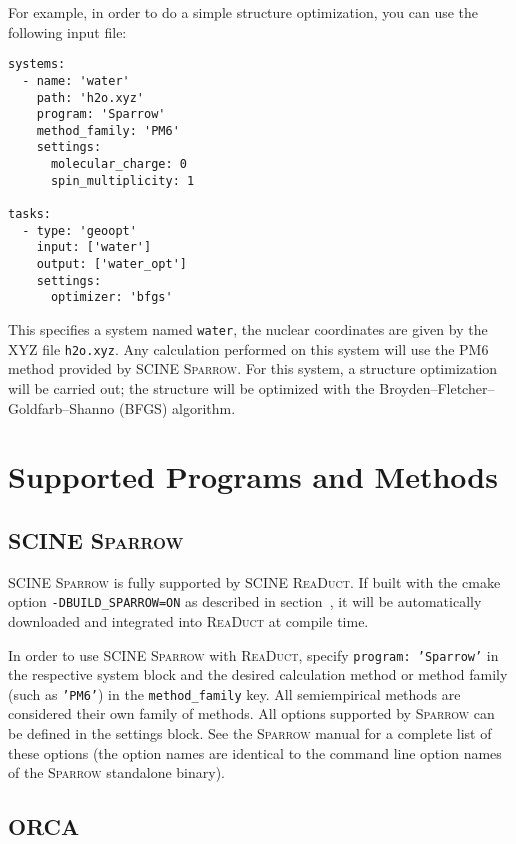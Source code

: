 \documentclass[]{tufte-book}
\begin{document}
For example, in order to do a simple structure optimization, you can use the following input file:

\begin{verbatim}
systems:
  - name: 'water'
    path: 'h2o.xyz'
    program: 'Sparrow'
    method_family: 'PM6'
    settings:
      molecular_charge: 0
      spin_multiplicity: 1

tasks:
  - type: 'geoopt'
    input: ['water']
    output: ['water_opt']
    settings:
      optimizer: 'bfgs'
\end{verbatim}

This specifies a system named \texttt{water}, the nuclear coordinates are given by the XYZ file \texttt{h2o.xyz}. Any 
calculation performed on this system will use the PM6 method provided by SCINE \textsc{Sparrow}. For this system, a
structure optimization will be carried out; the structure will be optimized with the Broyden--Fletcher--Goldfarb--Shanno (BFGS) algorithm.


\section{Supported Programs and Methods}

\subsection{SCINE \textsc{Sparrow}}

SCINE \textsc{Sparrow} is fully supported by SCINE \textsc{ReaDuct}. If built with the cmake option \texttt{-DBUILD\_SPARROW=ON}
as described in section~, it will be automatically downloaded and integrated into \textsc{ReaDuct}
at compile time.

In order to use SCINE \textsc{Sparrow} with \textsc{ReaDuct}, specify \texttt{program: 'Sparrow'} in the respective system
block and the desired calculation method or method family (such as \texttt{'PM6'}) in the \texttt{method\_family} key.
All semiempirical methods are considered their own family of methods.
All options supported by \textsc{Sparrow} can be defined in the settings block. See the \textsc{Sparrow} manual for a complete
list of these options (the option names are identical to the command line option names of the \textsc{Sparrow} standalone binary).

\subsection{ORCA}
\end{document}
